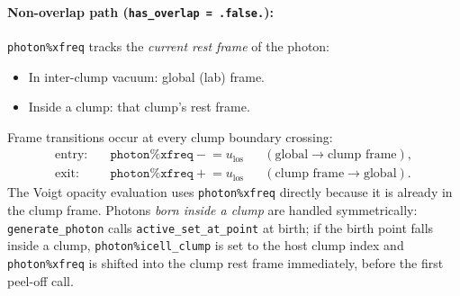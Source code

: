 \documentclass[english,a4paper]{my_memo}
\begin{document}
\paragraph{Non-overlap path (\texttt{has\_overlap = .false.}):}
\texttt{photon\%xfreq} tracks the \emph{current rest frame} of the photon:
\begin{itemize}
  \item In inter-clump vacuum: global (lab) frame.
  \item Inside a clump: that clump's rest frame.
\end{itemize}
Frame transitions occur at every clump boundary crossing:
\begin{align}
  \text{entry:} &\quad \texttt{photon\%xfreq} \mathrel{-}= u_\mathrm{los}
      &&(\text{global} \to \text{clump frame}), \\
  \text{exit:}  &\quad \texttt{photon\%xfreq} \mathrel{+}= u_\mathrm{los}
      &&(\text{clump frame} \to \text{global}).
\end{align}
The Voigt opacity evaluation uses \texttt{photon\%xfreq} directly because
it is already in the clump frame.  Photons \emph{born inside a clump} are
handled symmetrically: \texttt{generate\_photon} calls
\texttt{active\_set\_at\_point} at birth; if the birth point falls inside a
clump, \texttt{photon\%icell\_clump} is set to the host clump index and
\texttt{photon\%xfreq} is shifted into the clump rest frame immediately,
before the first peel-off call.
\end{document}
